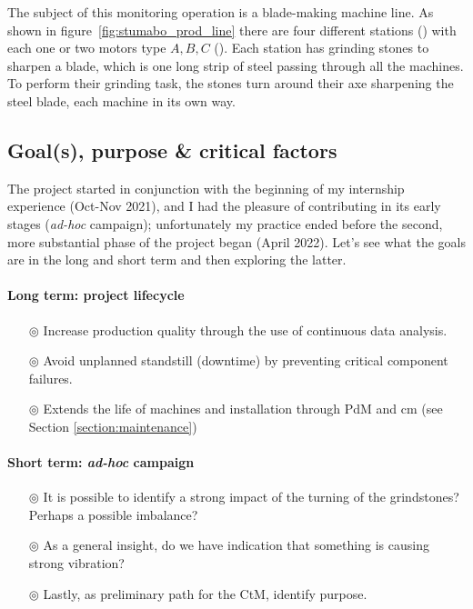 The subject of this monitoring operation is a blade-making machine line.
As shown in figure~\ref{fig:stumabo_prod_line} there are four different stations () with each one or two motors type ${A,B,C}$ ().
Each station has grinding stones to sharpen a blade, which is one long strip of steel passing through all the machines.
To perform their grinding task, the stones turn around their axe sharpening the steel blade, each machine in its own way.


\subsection{Goal(s), purpose \& critical factors}
The project started in conjunction with the beginning of my internship experience (Oct-Nov 2021), and I had the pleasure of contributing in its early stages (\textit{ad-hoc} campaign);
unfortunately my practice ended before the second, more substantial phase of the project began (April 2022).
Let's see what the goals are in the long and short term and then exploring the latter.
\paragraph{Long term: project lifecycle}
\begin{itemize}
    \item[$\circledcirc$] Increase production quality through the use of continuous data analysis.
    \item[$\circledcirc$] Avoid unplanned standstill (downtime) by preventing critical component failures.
    \item[$\circledcirc$] Extends the life of machines and installation through \acl{PdM} and \acl{cm} (see Section \ref{section:maintenance})
\end{itemize}
\paragraph{Short term: \textit{ad-hoc} campaign}
\begin{itemize}
    \item[$\circledcirc$] It is possible to identify a strong impact of the turning of the grindstones? Perhaps a possible imbalance?
    \item[$\circledcirc$] As a general insight, do we have indication that something is causing strong vibration?
    \item[$\circledcirc$] Lastly, as preliminary path for the \ac{CtM}, identify purpose.
\end{itemize}

